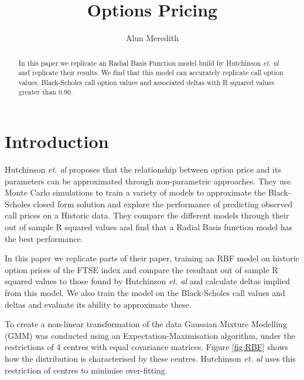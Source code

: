\documentclass{sig-alternate-05-2015}
\begin{document}
\author{Alun Meredith\vspace{-2ex}%
}
\title{Options Pricing \vspace{-2ex}%
}
\maketitle

\vspace{-30mm}
\small
\begin{abstract}
In this paper we replicate an Radial Basis Function model build by Hutchinson \textit{et. al} \cite{hutchinson1994nonparametric} and replicate their results. We find that this model can accurately replicate call option values, Black-Scholes call option values and associated deltas with R squared values greater than 0.90. 
\end{abstract}
\normalsize
\section{Introduction}
Hutchinson \textit{et. al} \cite{hutchinson1994nonparametric} proposes that the relationship between option price and its parameters can be approximated through non-parametric approaches. They use Monte Carlo simulations to train a variety of models to approximate the Black-Scholes closed form solution and explore the performance of predicting observed call prices on a Historic data. They compare the different models through their out of sample R squared values and find that a Radial Basis function model has the best performance. 

In this paper we replicate parts of their paper, training an RBF model on historic option prices of the FTSE index and compare the resultant out of sample R squared values to those found by Hutchinson \textit{et. al} and calculate deltas implied from this model. We also train the model on the Black-Scholes call values and deltas and evaluate its ability to approximate these. 


To create a non-linear transformation of the data Gaussian Mixture Modelling (GMM) was conducted using an Expectation-Maximisation algorithm, under the restrictions of 4 centres with equal covariance matrices. Figure \ref{fig:RBF} shows how the distribution is characterised by these centres. Hutchinson \textit{et. al} \cite{hutchinson1994nonparametric} uses this restriction of centres to minimise over-fitting.  
\end{document}

